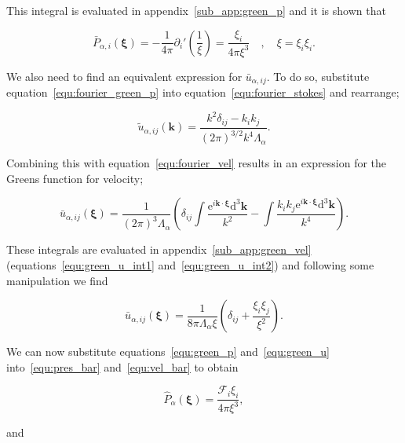 \documentclass[12pt]{article}
\begin{document}
This integral is evaluated in appendix~\ref{sub_app:green_p} and it is shown that

\begin{equation}
\label{equ:green_p}
\bar{P}_{\alpha, i} (\boldsymbol\xi) = -\frac{1}{4 \pi} \partial_{i}' \left(\frac{1}{\xi}\right) = \frac{\xi_{i}}{4 \pi \xi^{3}} \quad , \quad \xi = \xi_{i} \xi_{i} .
\end{equation}

We also need to find an equivalent expression for $\bar{u}_{\alpha,ij}$. To do so, substitute equation~\ref{equ:fourier_green_p} into equation~\ref{equ:fourier_stokes} and rearrange;

\begin{equation}
\label{equ:fourier_green_u}
\tilde{u}_{\alpha,ij} (\boldsymbol{k}) = \frac{k^{2} \delta_{ij} - k_{i} k_{j}}{(2 \pi)^{3/2} k^{4} \Lambda_{\alpha}} .
\end{equation}

Combining this with equation~\ref{equ:fourier_vel} results in an expression for the Greens function for velocity;

\begin{equation}
\label{equ:green_u_int}
\bar{u}_{\alpha,ij} (\boldsymbol\xi) = \frac{1}{(2 \pi)^{3} \Lambda_{\alpha}} \left(\delta_{ij} \int \frac{\mathrm{e}^{i \boldsymbol{k} \cdot \boldsymbol\xi} \mathrm{d}^{3} \boldsymbol{k}}{k^{2}} - \int \frac{k_{i} k_{j} \mathrm{e}^{i \boldsymbol{k} \cdot \boldsymbol\xi} \mathrm{d}^{3} \boldsymbol{k}}{k^{4}} \right).
\end{equation}

These integrals are evaluated in appendix~\ref{sub_app:green_vel} (equations~\ref{equ:green_u_int1} and~\ref{equ:green_u_int2}) and following some manipulation we find

\begin{equation}
\label{equ:green_u}
\bar{u}_{\alpha,ij} (\boldsymbol\xi) = \frac{1}{8 \pi \Lambda_{\alpha} \xi} \left(\delta_{ij} + \frac{\xi_{i} \xi_{j}}{\xi^{2}} \right).
\end{equation}

We can now substitute equations~\ref{equ:green_p} and~\ref{equ:green_u} into~\ref{equ:pres_bar} and~\ref{equ:vel_bar} to obtain

\begin{equation}
\label{equ:p_hat_eval}
\hat{P}_{\alpha} (\boldsymbol\xi) = \frac{\mathcal{F}_{i} \xi_{i}}{4 \pi \xi^{3}},
\end{equation}

and 
\end{document}
